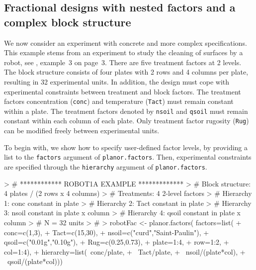 \documentclass[a4paper]{article}
\begin{document}
\subsection{Fractional designs with nested factors and a complex
  block structure}
We now consider an experiment with concrete and more complex
specifications. This example stems from an experiment to study the
cleaning of surfaces by a robot, see \cite{kobi05}, example~3 on
page~3. There are five treatment factors at 2 levels. The block
structure consists of four plates with 2 rows and 4 columns per plate,
resulting in 32 experimental units. In addition, the design must cope
with experimental constraints between treatment and block factors. The
treatment factors concentration (\texttt{conc}) and temperature
(\texttt{Tact}) must remain constant within a plate. The treatment
factors denoted by \texttt{nsoil} and \texttt{qsoil} must remain
constant within each column of each plate. Only treatment factor
rugosity (\texttt{Rug}) can be modified freely between experimental
units.

To begin with, we show how to specify user-defined factor levels, by
providing a list to the \texttt{factors} argument of
\texttt{planor.factors}. Then, experimental constraints are
specified through the \texttt{hierarchy} argument of
\texttt{planor.factors}.
\begin{Schunk}
\begin{Sinput}
> # ************ ROBOT1A EXAMPLE *************
> # Block structure: 4 plates / (2 rows x 4 columns)
> # Treatments: 4 2-level factors
> # Hierarchy 1: conc constant in plate
> # Hierarchy 2: Tact constant in plate
> # Hierarchy 3: nsoil constant in plate x column
> # Hierarchy 4: qsoil constant in plate x column
> # N = 32 units
> #
> robotFac <- planor.factors( factors=list(
+                             conc=c(1,3),
+                             Tact=c(15,30),
+                             nsoil=c("curd","Saint-Paulin"),
+                             qsoil=c("0.01g","0.10g"),
+                             Rug=c(0.25,0.73),
+                             plate=1:4,
+                             row=1:2,
+                             col=1:4),
+                            hierarchy=list(~conc/plate,
+                            ~Tact/plate,
+                            ~nsoil/(plate*col),
+                            ~qsoil/(plate*col)))
\end{Sinput}
\end{Schunk}
\end{document}
